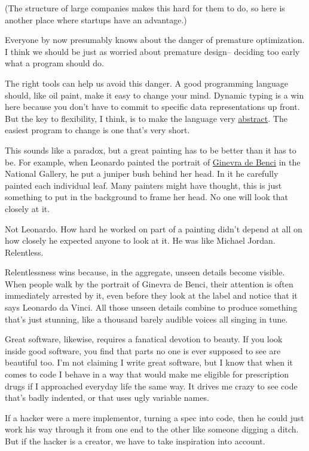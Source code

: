 (The structure of large companies makes this hard for them to do, so
here is another place where startups have an advantage.)

Everyone by now presumably knows about the danger of premature
optimization. I think we should be just as worried about premature
design-- deciding too early what a program should do.

The right tools can help us avoid this danger. A good programming
language should, like oil paint, make it easy to change your mind.
Dynamic typing is a win here because you don't have to commit to
specific data representations up front. But the key to flexibility, I
think, is to make the language very \href{power.html}{abstract}. The
easiest program to change is one that's very short.

This sounds like a paradox, but a great painting has to be better than
it has to be. For example, when Leonardo painted the portrait of
\href{ginevra.html}{Ginevra de Benci} in the National Gallery, he put a
juniper bush behind her head. In it he carefully painted each individual
leaf. Many painters might have thought, this is just something to put in
the background to frame her head. No one will look that closely at it.

Not Leonardo. How hard he worked on part of a painting didn't depend at
all on how closely he expected anyone to look at it. He was like Michael
Jordan. Relentless.

Relentlessness wins because, in the aggregate, unseen details become
visible. When people walk by the portrait of Ginevra de Benci, their
attention is often immediately arrested by it, even before they look at
the label and notice that it says Leonardo da Vinci. All those unseen
details combine to produce something that's just stunning, like a
thousand barely audible voices all singing in tune.

Great software, likewise, requires a fanatical devotion to beauty. If
you look inside good software, you find that parts no one is ever
supposed to see are beautiful too. I'm not claiming I write great
software, but I know that when it comes to code I behave in a way that
would make me eligible for prescription drugs if I approached everyday
life the same way. It drives me crazy to see code that's badly indented,
or that uses ugly variable names.

If a hacker were a mere implementor, turning a spec into code, then he
could just work his way through it from one end to the other like
someone digging a ditch. But if the hacker is a creator, we have to take
inspiration into account.

